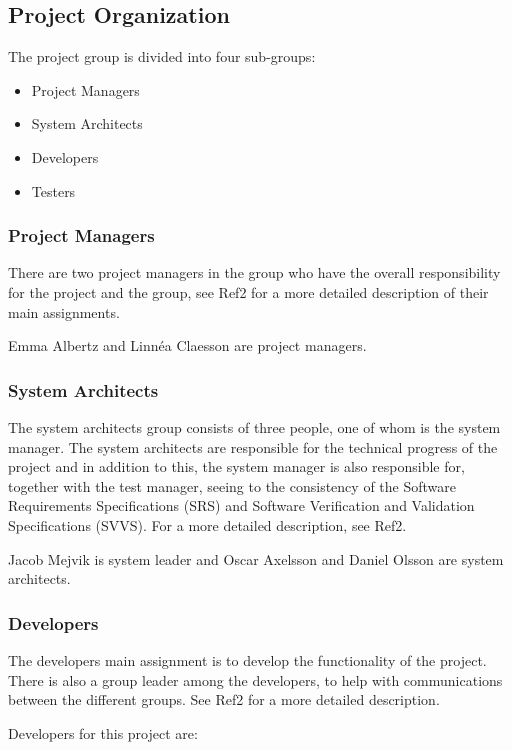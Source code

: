 \documentclass[a4paper]{article}
\begin{document}
\subsection{Project Organization}

The project group is divided into four sub-groups:
\begin{itemize}
\item Project Managers
\item System Architects
\item Developers
\item Testers
\end{itemize}

\subsubsection{Project Managers}
There are two project managers in the group who have the overall responsibility for the project and the group, see Ref2 for a more detailed description of their main assignments.

Emma Albertz and Linnéa Claesson are project managers.

\subsubsection{System Architects}
The system architects group consists of three people, one of whom is the system manager. The system architects are responsible for the technical progress of the project and in addition to this, the system manager is also responsible for, together with the test manager, seeing to the consistency of the Software Requirements Specifications (SRS) and Software Verification and Validation Specifications (SVVS). For a more detailed description, see Ref2.

Jacob Mejvik is system leader and Oscar Axelsson and Daniel Olsson are system architects.

\subsubsection{Developers}
The developers main assignment is to develop the functionality of the project. There is also a group leader among the developers, to help with communications between the different groups. See Ref2 for a more detailed description.

Developers for this project are: 
\end{document}

